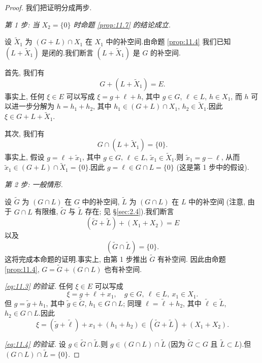 \begin{proof}
我们把证明分成两步.

\emph{第 1 步: 当 $X_2=\{0\}$ 时命题  \ref{prop:11.7} 的结论成立.}

设 $\widetilde X_1$ 为 $(G+L)\cap X_1$ 在 $X_1$ 中的补空间.由命题
 \ref{prop:11.4} 我们已知 $(L+\widetilde X_1)$ 是闭的.我们断言
$(L+\widetilde X_1)$ 是 $G$ 的补空间.

首先, 我们有
\begin{equation*}
G+(L+\widetilde X_1)=E.
\end{equation*}
事实上, 任何 $\xi\in E$ 可以写成 $\xi=g+\ell+h$, 其中 $g\in G$, $\ell\in L$,
$h\in X_1$, 而 $h$ 可以进一步分解为 $h=h_1+h_2$, 其中
$h_1\in(G+L)\cap X_1$, $h_2\in\widetilde X_1$.因此
$\xi\in G+L+\widetilde X_1$.

其次, 我们有
\begin{equation*}
G\cap(L+\widetilde X_1)=\{0\}.
\end{equation*}
事实上, 假设 $g=\ell+\tilde x_1$, 其中 $g\in G$, $\ell\in L$,
$\tilde x_1\in\widetilde X_1$.则 $\tilde x_1=g-\ell$, 从而
$\tilde x_1\in(G+L)\cap\widetilde X_1=\{0\}$.因此
$g=\ell\in G\cap L=\{0\}$ (这是第 1 步中的假设).

\emph{第 2 步: 一般情形.}

设 $\widetilde G$ 为 $(G\cap L)$ 在 $G$ 中的补空间, $\widetilde L$ 为
$(G\cap L)$ 在 $L$ 中的补空间 (注意, 由于 $G\cap L$ 有限维,
$\widetilde G$ 与 $\widetilde L$ 存在; 见 \S \ref{sec:2.4}).我们断言
\begin{equation}
(\widetilde G+\widetilde L)+(X_1+X_2)=E
\label{eq:11.3}
\end{equation}
以及
\begin{equation}
(\widetilde G\cap\widetilde L)=\{0\}.
\label{eq:11.4}
\end{equation}
这将完成本命题的证明.事实上, 由第 1 步推出 $\widetilde G$ 有补空间.
因此由命题  \ref{prop:11.4}, $G=\widetilde G+(G\cap L)$ 也有补空间.

\emph{\eqref{eq:11.3} 的验证.} 任何 $\xi\in E$ 可以写成
\begin{equation*}
\xi=g+\ell+x_1,\quad g\in G,\ \ell\in L,\ x_1\in X_1.
\end{equation*}
但 $g=\tilde g+h_1$, 其中 $\tilde g\in\widetilde G$, $h_1\in G\cap L$;
同理 $\ell=\tilde\ell+h_2$, 其中 $\tilde\ell\in\widetilde L$,
$h_2\in G\cap L$.因此
\begin{equation*}
\xi=(\tilde g+\tilde\ell)+x_1+(h_1+h_2)\in(\widetilde G+\widetilde L)+(X_1+X_2).
\end{equation*}

\emph{\eqref{eq:11.4} 的验证.} 设 $g\in\widetilde G\cap\widetilde L$.则
$g\in(G\cap L)\cap\widetilde L$ (因为 $\widetilde G\subset G$ 且
$\widetilde L\subset L$).但 $(G\cap L)\cap\widetilde L=\{0\}$.
\end{proof}
